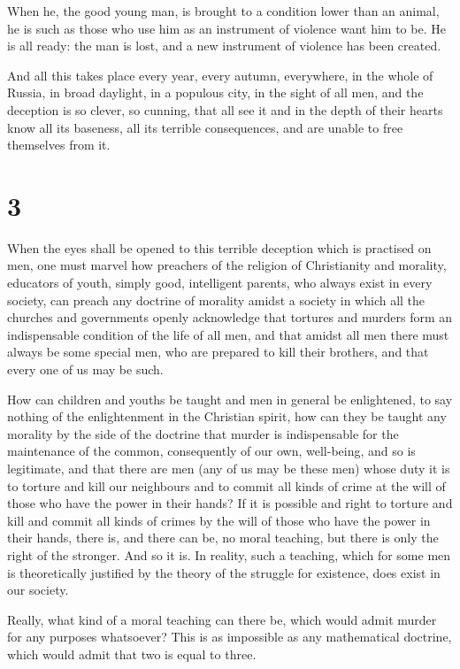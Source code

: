 \documentclass{book}
\begin{document}
When he, the good young man, is brought to a condition lower than an animal, he is such as those who use him as an instrument of violence want him to be. He is all ready: the man is lost, and a new instrument of violence has been created.

And all this takes place every year, every autumn, everywhere, in the whole of Russia, in broad daylight, in a populous city, in the sight of all men, and the deception is so clever, so cunning, that all see it and in the depth of their hearts know all its baseness, all its terrible consequences, and are unable to free themselves from it.

\section*{3}
When the eyes shall be opened to this terrible deception which is practised on men, one must marvel how preachers of the religion of Christianity and morality, educators of youth, simply good, intelligent parents, who always exist in every society, can preach any doctrine of morality amidst a society in which all the churches and governments openly acknowledge that tortures and murders form an indispensable condition of the life of all men, and that amidst all men there must always be some special men, who are prepared to kill their brothers, and that every one of us may be such.

How can children and youths be taught and men in general be enlightened, to say nothing of the enlightenment in the Christian spirit, how can they be taught any morality by the side of the doctrine that murder is indispensable for the maintenance of the common, consequently of our own, well-being, and so is legitimate, and that there are men (any of us may be these men) whose duty it is to torture and kill our neighbours and to commit all kinds of crime at the will of those who have the power in their hands? If it is possible and right to torture and kill and commit all kinds of crimes by the will of those who have the power in their hands, there is, and there can be, no moral teaching, but there is only the right of the stronger. And so it is. In reality, such a teaching, which for some men is theoretically justified by the theory of the struggle for existence, does exist in our society.

Really, what kind of a moral teaching can there be, which would admit murder for any purposes whatsoever? This is as impossible as any mathematical doctrine, which would admit that two is equal to three.
\end{document}
